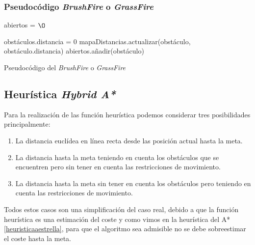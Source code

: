 \subsubsection{Pseudocódigo \textit{BrushFire} o \textit{GrassFire}}
\begin{algorithm}[H]
	abiertos = $\O$\;

    
     {
    		obstáculos.distancia = 0\;
    		mapaDistancias.actualizar(obstáculo, obstáculo.distancia)\;
    		abiertos.añadir(obstáculo)\;
    	}


 \caption{Pseudocódigo del \textit{BrushFire} o \textit{GrassFire}}
\end{algorithm}

\subsection{Heurística \textit{Hybrid A*}} \label{hueristicahybrid}
Para la realización de las función heurística podemos considerar tres posibilidades principalmente:

\begin{enumerate}
\item La distancia euclídea en línea recta desde las posición actual hasta la meta.
\item La distancia hasta la meta teniendo en cuenta los obstáculos que se encuentren pero sin tener en cuenta las restricciones de movimiento.
\item La distancia hasta la meta sin tener en cuenta los obstáculos pero teniendo en cuenta las restricciones de movimiento.
\end{enumerate}

Todos estos casos son una simplificación del caso real, debido a que la función heurística es una estimación del coste y como vimos en la heurística del A* \ref{heuristicaaestrella}, para que el algoritmo sea admisible no se debe sobreestimar el coste hasta la meta.

